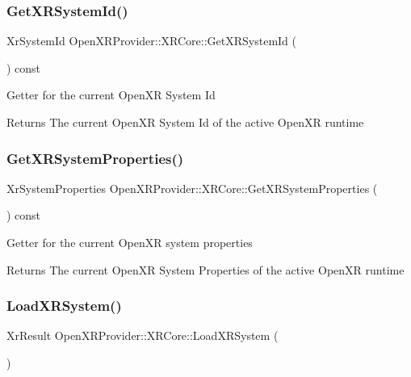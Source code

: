 \subsubsection{\texorpdfstring{GetXRSystemId()}{GetXRSystemId()}}
{\footnotesize\ttfamily Xr\+System\+Id Open\+X\+R\+Provider\+::\+X\+R\+Core\+::\+Get\+X\+R\+System\+Id (\begin{DoxyParamCaption}{ }\end{DoxyParamCaption}) const\hspace{0.3cm}{\ttfamily [inline]}}

Getter for the current Open\+XR System Id \begin{DoxyReturn}{Returns}
The current Open\+XR System Id of the active Open\+XR runtime 
\end{DoxyReturn}
\mbox{\label{class_open_x_r_provider_1_1_x_r_core_ac7f545d98dfecc2417008d2ab28e3890}} 
\subsubsection{\texorpdfstring{GetXRSystemProperties()}{GetXRSystemProperties()}}
{\footnotesize\ttfamily Xr\+System\+Properties Open\+X\+R\+Provider\+::\+X\+R\+Core\+::\+Get\+X\+R\+System\+Properties (\begin{DoxyParamCaption}{ }\end{DoxyParamCaption}) const\hspace{0.3cm}{\ttfamily [inline]}}

Getter for the current Open\+XR system properties \begin{DoxyReturn}{Returns}
The current Open\+XR System Properties of the active Open\+XR runtime 
\end{DoxyReturn}
\mbox{\label{class_open_x_r_provider_1_1_x_r_core_af49a490e66fc60337ad41bbb107e82c8}} 
\subsubsection{\texorpdfstring{LoadXRSystem()}{LoadXRSystem()}}
{\footnotesize\ttfamily Xr\+Result Open\+X\+R\+Provider\+::\+X\+R\+Core\+::\+Load\+X\+R\+System (\begin{DoxyParamCaption}{ }\end{DoxyParamCaption})\hspace{0.3cm}{\ttfamily [private]}}

